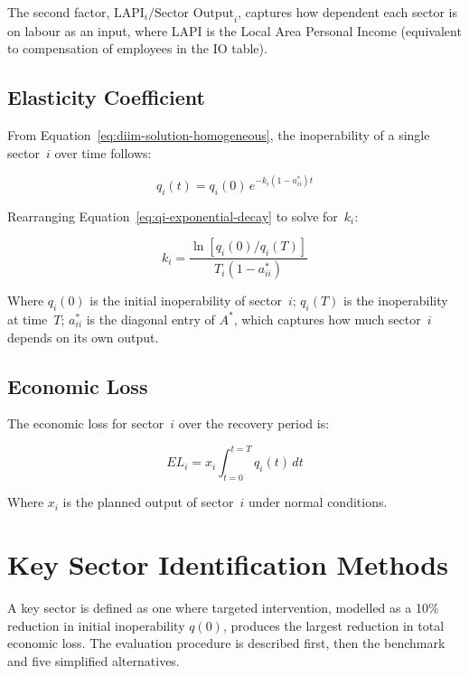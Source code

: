 The second factor, $\text{LAPI}_i / \text{Sector Output}_i$, captures how dependent each sector is on labour as an input, where LAPI is the Local Area Personal Income (equivalent to compensation of employees in the IO table).

\subsection{Elasticity Coefficient}

From Equation~\eqref{eq:diim-solution-homogeneous}, the inoperability of a single sector~$i$ over time follows:

\begin{equation}
    q_i(t) = q_i(0) \, e^{-k_i \left( 1 - a_{ii}^{*} \right) t}
    \label{eq:qi-exponential-decay}
\end{equation}

Rearranging Equation~\eqref{eq:qi-exponential-decay} to solve for~$k_i$:

\begin{equation}
    k_i = \frac{\ln\left[q_i(0)/q_i(T)\right]}{T_i\left(1 - a_{ii}^{*}\right)}
    \label{eq:ki-definition}
\end{equation}

Where $q_i(0)$ is the initial inoperability of sector~$i$; $q_i(T)$ is the inoperability at time~$T$; $a_{ii}^{*}$ is the diagonal entry of $A^{*}$, which captures how much sector~$i$ depends on its own output.

\subsection{Economic Loss}

The economic loss for sector~$i$ over the recovery period is:

\begin{equation}
    EL_i = x_i \int_{t=0}^{t=T} q_i(t) \, dt
    \label{eq:economic-loss}
\end{equation}

Where $x_i$ is the planned output of sector~$i$ under normal conditions.


\section{Key Sector Identification Methods}
\label{sec:simplified-methods}

A key sector is defined as one where targeted intervention, modelled as a 10\% reduction in initial inoperability $q(0)$, produces the largest reduction in total economic loss. The evaluation procedure is described first, then the benchmark and five simplified alternatives.

